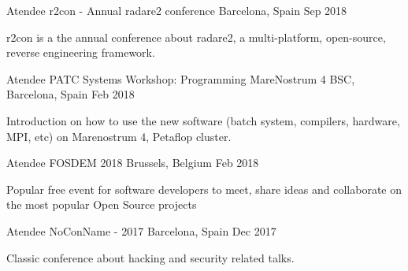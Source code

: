 \begin{cvhonors}
\cventry
{Atendee } %
{r2con - Annual radare2 conference} %
{Barcelona, Spain} %
{Sep 2018} %
{ %
	\begin{cvitems}
		\item {r2con is a the annual conference about radare2, a multi-platform, open-source, reverse engineering framework.}
	\end{cvitems}
}

\cventry
{Atendee } %
{PATC Systems Workshop: Programming MareNostrum 4} %
{BSC, Barcelona, Spain} %
{Feb 2018} %
{ %
	\begin{cvitems}
		\item {Introduction on how to use the new software (batch system, compilers, hardware, MPI, etc) on Marenostrum 4, Petaflop cluster.}
	\end{cvitems}
}

\cventry
{Atendee } %
{FOSDEM 2018} %
{Brussels, Belgium} %
{Feb 2018} %
{ %
	\begin{cvitems}
		\item {Popular free event for software developers to meet, share ideas and collaborate on the most popular Open Source projects}
	\end{cvitems}
}

\cventry
{Atendee } %
{NoConName - 2017} %
{Barcelona, Spain} %
{Dec 2017} %
{ %
	\begin{cvitems}
		\item { Classic conference about hacking and security related talks.}
	\end{cvitems}
}

\end{cvhonors}